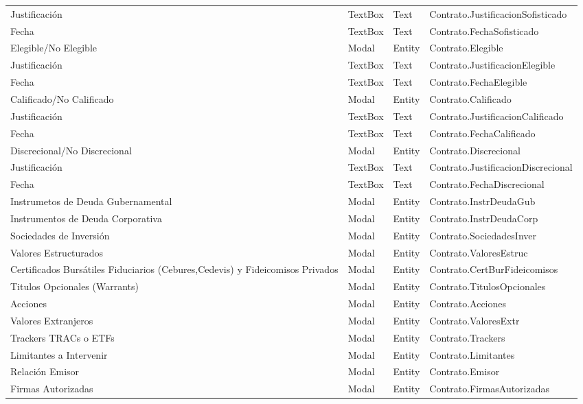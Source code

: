 \begin{table}[H]
{\begin{tabular}{ p{4cm} p{2cm} p{2cm} p{7cm} }
		Justificaci\'on &
		TextBox &
		Text &
		Contrato.JustificacionSofisticado \\
		Fecha &
		TextBox &
		Text &
		Contrato.FechaSofisticado \\
		Elegible/No Elegible &
		Modal &
		Entity &
		Contrato.Elegible \\
		Justificaci\'on &
		TextBox &
		Text &
		Contrato.JustificacionElegible \\
		Fecha &
		TextBox &
		Text &
		Contrato.FechaElegible \\
		Calificado/No Calificado &
		Modal &
		Entity &
		Contrato.Calificado \\
		Justificaci\'on &
		TextBox &
		Text &
		Contrato.JustificacionCalificado \\
		Fecha &
		TextBox &
		Text &
		Contrato.FechaCalificado \\
		Discrecional/No Discrecional &
		Modal &
		Entity &
		Contrato.Discrecional \\
		Justificaci\'on &
		TextBox &
		Text &
		Contrato.JustificacionDiscrecional \\
		Fecha &
		TextBox &
		Text &
		Contrato.FechaDiscrecional \\
		Instrumetos de Deuda Gubernamental &
		Modal &
		Entity &
		Contrato.InstrDeudaGub \\
		Instrumentos de Deuda Corporativa &
		Modal &
		Entity &
		Contrato.InstrDeudaCorp \\
		Sociedades de Inversi\'on &
		Modal &
		Entity &
		Contrato.SociedadesInver \\
		Valores Estructurados &
		Modal &
		Entity &
		Contrato.ValoresEstruc \\
		Certificados Burs\'atiles Fiduciarios (Cebures,Cedevis) y Fideicomisos Privados &
		Modal &
		Entity &
		Contrato.CertBurFideicomisos \\
		Titulos Opcionales (Warrants) &
		Modal &
		Entity &
		Contrato.TitulosOpcionales \\
		Acciones &
		Modal &
		Entity &
		Contrato.Acciones \\
		Valores Extranjeros &
		Modal &
		Entity &
		Contrato.ValoresExtr \\
		Trackers TRACs o ETFs &
		Modal &
		Entity &
		Contrato.Trackers \\
		Limitantes a Intervenir &
		Modal &
		Entity &
		Contrato.Limitantes \\
		Relaci\'on Emisor &
		Modal &
		Entity &
		Contrato.Emisor \\
		Firmas Autorizadas &
		Modal &
		Entity &
		Contrato.FirmasAutorizadas \\
		\hline
	\end{tabular}
	}
\end{table}

